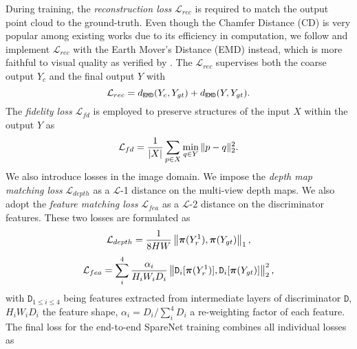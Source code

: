 \documentclass[final]{cvpr}
\begin{document}
During training, the \emph{reconstruction loss} $\mathcal{L}_{rec}$ is required to match the output point cloud to the ground-truth. 
Even though the Chamfer Distance (CD) is very popular among existing works due to its efficiency in computation,
we follow \cite{liu2019morphing} and implement $\mathcal{L}_{rec}$ with the Earth Mover's Distance (EMD) instead, which is more faithful to visual quality as verified by \cite{fan2017pointsetgeneration,achlioptas2018learning,liu2019morphing}. The $\mathcal{L}_{rec}$ supervises both the coarse output $Y_c$ and the final output $Y$ with
\vspace{-0.5em}
\begin{equation}
\vspace{-0.5em}
\mathcal{L}_{rec} = d_\texttt{EMD}(Y_c, Y_{gt}) + d_\texttt{EMD}(Y, Y_{gt}).
\label{equ:l_rec}
\end{equation}
The \emph{fidelity loss} $\mathcal{L}_{fd}$ is employed to preserve structures of the input $X$ within the output $Y$ as
\vspace{-0.5em}
\begin{equation}
\vspace{-0.5em}
\mathcal{L}_{fd} = \frac{1}{|X|} \sum_{p\in X}\min_{q \in Y}  \| p - q \|_2^2.
\end{equation}
We also introduce losses in the image domain. We impose the \emph{depth map matching loss} $\mathcal{L}_{depth}$ as a $\mathcal{L}$-1 distance on the multi-view depth maps. We also adopt the \emph{feature matching loss} $\mathcal{L}_{fea}$ as a $\mathcal{L}$-2 distance on the discriminator features. These two losses are formulated as
\vspace{-0.5em}
\begin{equation}
\vspace{-0.5em}
\mathcal{L}_{depth} =\frac{1}{8HW} \left\| \bm{\pi}(Y_r^1), \bm{\pi}(Y_{gt})\right\|_1,
\vspace{-0.5em}
\end{equation}
\begin{equation}
\vspace{-0.5em}
\mathcal{L}_{fea} = \sum_i^4 \frac{\alpha_i}{H_i W_i D_i} \left\| \mathtt{D}_i[\bm{\pi}(Y_r^1)], \mathtt{D}_i[\bm{\pi}(Y_{gt})]\right\|_2^2,
\end{equation}
with $\mathtt{D}_{1\leq i \leq 4}$ being features extracted from intermediate layers of discriminator $\mathtt{D}$,
$H_i W_i D_i$ the feature shape, $\alpha_i=D_i/\sum_i^4 D_i$ a re-weighting factor of each feature.
The final loss for the end-to-end SpareNet training combines all individual losses as
\end{document}
